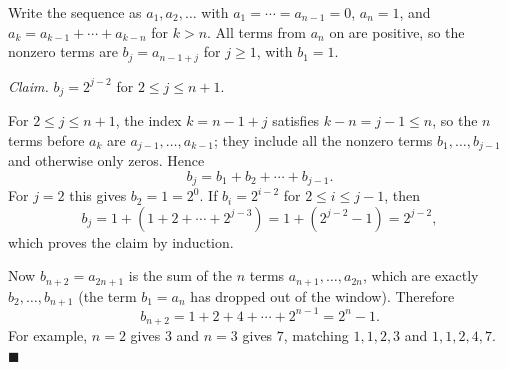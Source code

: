 Write the sequence as \(a_1,a_2,\dots\) with \(a_1=\cdots=a_{n-1}=0\), \(a_n=1\), and \(a_k=a_{k-1}+\cdots+a_{k-n}\) for \(k>n\). All terms from \(a_n\) on are positive, so the nonzero terms are \(b_j=a_{n-1+j}\) for \(j\ge1\), with \(b_1=1\).

\emph{Claim.} \(b_j=2^{j-2}\) for \(2\le j\le n+1\).

For \(2\le j\le n+1\), the index \(k=n-1+j\) satisfies \(k-n=j-1\le n\), so the \(n\) terms before \(a_k\) are \(a_{j-1},\dots,a_{k-1}\); they include all the nonzero terms \(b_1,\dots,b_{j-1}\) and otherwise only zeros. Hence
\[
b_j=b_1+b_2+\cdots+b_{j-1}.
\]
For \(j=2\) this gives \(b_2=1=2^0\). If \(b_i=2^{i-2}\) for \(2\le i\le j-1\), then
\[
b_j=1+(1+2+\cdots+2^{j-3})=1+(2^{j-2}-1)=2^{j-2},
\]
which proves the claim by induction.

Now \(b_{n+2}=a_{2n+1}\) is the sum of the \(n\) terms \(a_{n+1},\dots,a_{2n}\), which are exactly \(b_2,\dots,b_{n+1}\) (the term \(b_1=a_n\) has dropped out of the window). Therefore
\[
b_{n+2}=1+2+4+\cdots+2^{n-1}=2^n-1 .
\]
For example, \(n=2\) gives \(3\) and \(n=3\) gives \(7\), matching \(1,1,2,3\) and \(1,1,2,4,7\). \(\blacksquare\)

